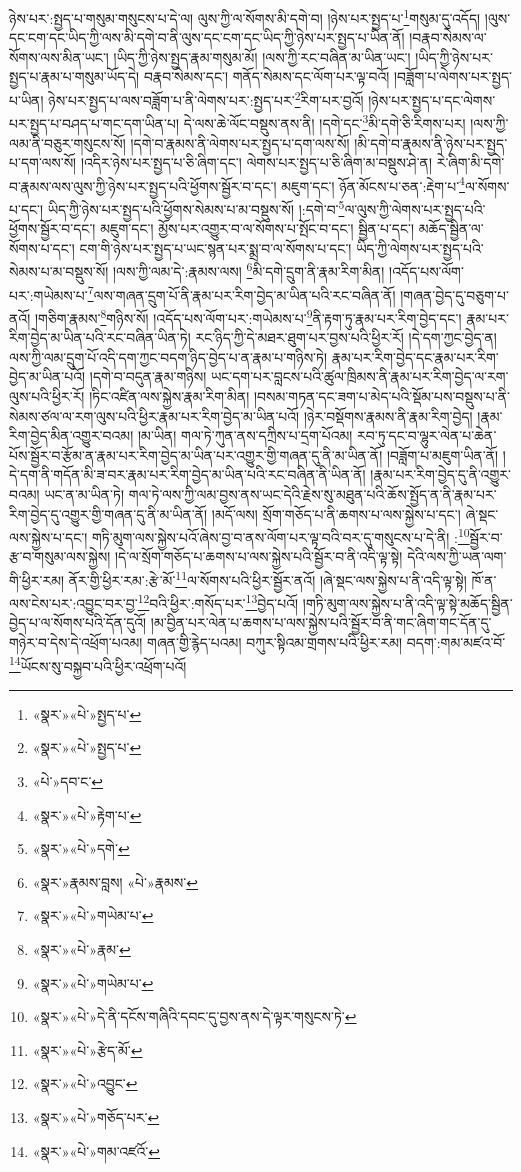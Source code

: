 ཉེས་པར་:སྤྱད་པ་གསུམ་གསུངས་པ་དེ་ལ། ལུས་ཀྱི་ལ་སོགས་མི་དགེ་བ། །ཉེས་པར་སྤྱད་པ་\footnote{«སྣར་»«པེ་»སྤྱད་པ་}གསུམ་དུ་འདོད། །ལུས་དང་ངག་དང་ཡིད་ཀྱི་ལས་མི་དགེ་བ་ནི་ལུས་དང་ངག་དང་ཡིད་ཀྱི་ཉེས་པར་སྤྱད་པ་ཡིན་ནོ། །བརྣབ་སེམས་ལ་སོགས་ལས་མིན་ཡང་། །ཡིད་ཀྱི་ཉེས་སྤྱད་རྣམ་གསུམ་མོ། །ལས་ཀྱི་རང་བཞིན་མ་ཡིན་ཡང་། །ཡིད་ཀྱི་ཉེས་པར་སྤྱད་པ་རྣམ་པ་གསུམ་ཡོད་དེ། བརྣབ་སེམས་དང་། གནོད་སེམས་དང་ལོག་པར་ལྟ་བའོ། །བཟློག་པ་ལེགས་པར་སྤྱད་པ་ཡིན། ཉེས་པར་སྤྱད་པ་ལས་བཟློག་པ་ནི་ལེགས་པར་:སྤྱད་པར་\footnote{«སྣར་»«པེ་»སྤྱད་པ་}རིག་པར་བྱའོ། །ཉེས་པར་སྤྱད་པ་དང་ལེགས་པར་སྤྱད་པ་བཤད་པ་གང་དག་ཡིན་པ། དེ་ལས་ཆེ་ལོང་བསྡུས་ནས་ནི། །དགེ་དང་\footnote{«པེ་»དབ་ང་}མི་དགེ་ཅི་རིགས་པར། །ལས་ཀྱི་ལམ་ནི་བཅུར་གསུངས་སོ། །དགེ་བ་རྣམས་ནི་ལེགས་པར་སྤྱད་པ་དག་ལས་སོ། །མི་དགེ་བ་རྣམས་ནི་ཉེས་པར་སྤྱད་པ་དག་ལས་སོ། །འདིར་ཉེས་པར་སྤྱད་པ་ཅི་ཞིག་དང་། ལེགས་པར་སྤྱད་པ་ཅི་ཞིག་མ་བསྡུས་ཤེ་ན། རེ་ཞིག་མི་དགེ་བ་རྣམས་ལས་ལུས་ཀྱི་ཉེས་པར་སྤྱད་པའི་ཕྱོགས་སྦྱོར་བ་དང་། མཇུག་དང་། ཉོན་མོངས་པ་ཅན་:རྡེག་པ་\footnote{«སྣར་»«པེ་»རྟེག་པ་}ལ་སོགས་པ་དང་། ཡིད་ཀྱི་ཉེས་པར་སྤྱད་པའི་ཕྱོགས་སེམས་པ་མ་བསྡུས་སོ། །:དགེ་བ་\footnote{«སྣར་»«པེ་»དགེ་}ལ་ལུས་ཀྱི་ལེགས་པར་སྤྱད་པའི་ཕྱོགས་སྦྱོར་བ་དང་། མཇུག་དང་། མྱོས་པར་འགྱུར་བ་ལ་སོགས་པ་སྤོང་བ་དང་། སྦྱིན་པ་དང་། མཆོད་སྦྱིན་ལ་སོགས་པ་དང་། ངག་གི་ཉེས་པར་སྤྱད་པ་ཡང་སྙན་པར་སྨྲ་བ་ལ་སོགས་པ་དང་། ཡིད་ཀྱི་ལེགས་པར་སྤྱད་པའི་སེམས་པ་མ་བསྡུས་སོ། །ལས་ཀྱི་ལམ་དེ་:རྣམས་ལས། \footnote{«སྣར་»རྣམས་བླས། «པེ་»རྣམས་}མི་དགེ་དྲུག་ནི་རྣམ་རིག་མིན། །འདོད་པས་ལོག་པར་:གཡེམས་པ་\footnote{«སྣར་»«པེ་»གཡེམ་པ་}ལས་གཞན་དྲུག་པོ་ནི་རྣམ་པར་རིག་བྱེད་མ་ཡིན་པའི་རང་བཞིན་ནོ། །གཞན་བྱེད་དུ་བཅུག་པ་ནའོ། །གཅིག་རྣམས་\footnote{«སྣར་»«པེ་»རྣམ་}གཉིས་སོ། །འདོད་པས་ལོག་པར་:གཡེམས་པ་\footnote{«སྣར་»«པེ་»གཡེམ་པ་}ནི་རྟག་ཏུ་རྣམ་པར་རིག་བྱེད་དང་། རྣམ་པར་རིག་བྱེད་མ་ཡིན་པའི་རང་བཞིན་ཡིན་ཏེ། རང་ཉིད་ཀྱི་དེ་མཐར་ཐུག་པར་བྱས་པའི་ཕྱིར་རོ། །དེ་དག་ཀྱང་བྱེད་ན། ལས་ཀྱི་ལམ་དྲུག་པོ་འདི་དག་ཀྱང་བདག་ཉིད་བྱེད་པ་ན་རྣམ་པ་གཉིས་ཏེ། རྣམ་པར་རིག་བྱེད་དང་རྣམ་པར་རིག་བྱེད་མ་ཡིན་པའོ། །དགེ་བ་བདུན་རྣམ་གཉིས། ཡང་དག་པར་བླངས་པའི་ཚུལ་ཁྲིམས་ནི་རྣམ་པར་རིག་བྱེད་ལ་རག་ལུས་པའི་ཕྱིར་རོ། །ཏིང་འཛིན་ལས་སྐྱེས་རྣམ་རིག་མིན། །བསམ་གཏན་དང་ཟག་པ་མེད་པའི་སྡོམ་པས་བསྡུས་པ་ནི་སེམས་ཙལ་ལ་རག་ལུས་པའི་ཕྱིར་རྣམ་པར་རིག་བྱེད་མ་ཡིན་པའོ། །ཉེར་བསྡོགས་རྣམས་ནི་རྣམ་རིག་བྱེད། །རྣམ་རིག་བྱེད་མིན་འགྱུར་བའམ། །མ་ཡིན། གལ་ཏེ་ཀུན་ནས་དཀྲིས་པ་དྲག་པོའམ། རབ་ཏུ་དང་བ་ལྷུར་ལེན་པ་ཆེན་པོས་སྦྱོར་བ་རྩོམ་ན་རྣམ་པར་རིག་བྱེད་མ་ཡིན་པར་འགྱུར་གྱི་གཞན་དུ་ནི་མ་ཡིན་ནོ། །བཟློག་པ་མཇུག་ཡིན་ནོ། །དེ་དག་ནི་གདོན་མི་ཟ་བར་རྣམ་པར་རིག་བྱེད་མ་ཡིན་པའི་རང་བཞིན་ནི་ཡིན་ནོ། །རྣམ་པར་རིག་བྱེད་དུ་ནི་འགྱུར་བའམ། ཡང་ན་མ་ཡིན་ཏེ། གལ་ཏེ་ལས་ཀྱི་ལམ་བྱས་ནས་ཡང་དེའི་རྗེས་སུ་མཐུན་པའི་ཆོས་སྤྱོད་ན་ནི་རྣམ་པར་རིག་བྱེད་དུ་འགྱུར་གྱི་གཞན་དུ་ནི་མ་ཡིན་ནོ། །མདོ་ལས། སྲོག་གཅོད་པ་ནི་ཆགས་པ་ལས་སྐྱེས་པ་དང་། ཞེ་སྡང་ལས་སྐྱེས་པ་དང་། གཏི་མུག་ལས་སྐྱེས་པའོ་ཞེས་བྱ་བ་ནས་ལོག་པར་ལྟ་བའི་བར་དུ་གསུངས་པ་དེ་ནི། :\footnote{«སྣར་»«པེ་»དེ་ནི་དངོས་གཞིའི་དབང་དུ་བྱས་ནས་དེ་ལྟར་གསུངས་ཏེ་}སྦྱོར་བ་རྩ་བ་གསུམ་ལས་སྐྱེས། །དེ་ལ་སྲོག་གཅོད་པ་ཆགས་པ་ལས་སྐྱེས་པའི་སྦྱོར་བ་ནི་འདི་ལྟ་སྟེ། དེའི་ལས་ཀྱི་ཡན་ལག་གི་ཕྱིར་རམ། ནོར་གྱི་ཕྱིར་རམ་:རྩེ་མོ་\footnote{«སྣར་»«པེ་»རྩེད་མོ་}ལ་སོགས་པའི་ཕྱིར་སྦྱོར་ནའོ། །ཞེ་སྡང་ལས་སྐྱེས་པ་ནི་འདི་ལྟ་སྟེ། ཁོ་ན་ལས་ངེས་པར་:འབྱུང་བར་བྱ་\footnote{«སྣར་»«པེ་»འབྱུང་}བའི་ཕྱིར་:གསོད་པར་\footnote{«སྣར་»«པེ་»གཅོད་པར་}བྱེད་པའོ། །གཏི་མུག་ལས་སྐྱེས་པ་ནི་འདི་ལྟ་སྟེ་མཆོད་སྦྱིན་བྱེད་པ་ལ་སོགས་པའི་དོན་དུའོ། །མ་བྱིན་པར་ལེན་པ་ཆགས་པ་ལས་སྐྱེས་པའི་སྦྱོར་བ་ནི་གང་ཞིག་གང་དོན་དུ་གཉེར་བ་དེས་དེ་འཕྲོག་པའམ། གཞན་གྱི་རྙེད་པའམ། བཀུར་སྟིའམ་གྲགས་པའི་ཕྱིར་རམ། བདག་:གམ་མཛའ་བོ་\footnote{«སྣར་»«པེ་»གམ་འཛའོ་}ཡོངས་སུ་བསྐྱབ་པའི་ཕྱིར་འཕྲོག་པའོ། 